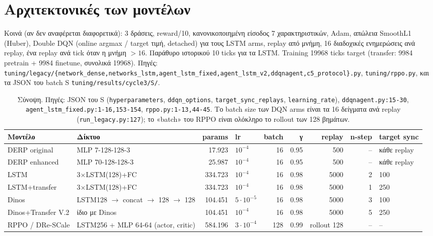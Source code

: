 \documentclass[10pt,a4paper]{article}
\newcommand{\ptr}[1]{{\footnotesize\texttt{#1}}}
\begin{document}
\section{Αρχιτεκτονικές των μοντέλων}
Κοινά (αν δεν αναφέρεται διαφορετικά): 3 δράσεις, reward/10, κανονικοποιημένη είσοδος 7 χαρακτηριστικών, Adam, απώλεια SmoothL1 (Huber), Double DQN (online argmax / target τιμή, detached) για τους LSTM arms, replay από μνήμη, 16 διαδοχικές ενημερώσεις ανά replay, ένα replay ανά tick όταν η μνήμη $>16$. Παράθυρο ιστορικού 10 ticks για τα LSTM. Training 19968 ticks target (transfer: 9984 pretrain + 9984 finetune, συνολικά 19968). Πηγές: \ptr{tuning/legacy/\{network\_dense,networks\_lstm,agent\_lstm\_fixed,agent\_lstm\_v2,ddqnagent,c5\_protocol\}.py}, \ptr{tuning/rppo.py}, και τα JSON του batch S \ptr{tuning/results/cycle3/S/}.
\begin{table}[H]\centering\scriptsize\setlength{\tabcolsep}{3pt}\begin{tabular}{p{2.4cm}p{3.9cm}rp{1.1cm}rrrrp{1.4cm}}\toprule
Μοντέλο & Δίκτυο & params & lr & batch & γ & replay & n-step & target sync\\\midrule
DERP original & MLP 7-128-128-3 & 17.923 & $10^{-4}$ & 16 & 0.95 & 500 & -- & κάθε replay\\
DERP enhanced & MLP 70-128-128-3 & 25.987 & $10^{-4}$ & 16 & 0.95 & 500 & -- & κάθε replay\\
LSTM & 3$\times$LSTM(128)+FC & 334.723 & $10^{-4}$ & 16 & 0.98 & 5000 & 2 & 100\\
LSTM+transfer & 3$\times$LSTM(128)+FC & 334.723 & $10^{-4}$ & 16 & 0.98 & 5000 & 1 & 250\\
Dinos & LSTM128 $\to$ concat $\to$ 128 $\to$ 128 & 104.451 & $5\cdot10^{-5}$ & 16 & 0.98 & 5000 & 3 & 100\\
Dinos+Transfer V.2 & ίδιο με Dinos & 104.451 & $10^{-4}$ & 16 & 0.98 & 5000 & 5 & 250\\
RPPO / DRe-SCale & LSTM256 + MLP 64-64 (actor, critic) & 584.196 & $3\cdot10^{-4}$ & 128 & 0.99 & rollout 128 & -- & -- \\\bottomrule\end{tabular}
\caption{Σύνοψη. Πηγές: JSON του S (\texttt{hyperparameters}, \texttt{ddqn\_options}, \texttt{target\_sync\_replays}, \texttt{learning\_rate}), \ptr{ddqnagent.py:15-30}, \ptr{agent\_lstm\_fixed.py:1-16,153-154}, \ptr{rppo.py:1-13,44-45}. Το batch size των DQN arms είναι τα 16 δείγματα ανά replay (\ptr{run\_legacy.py:127}); το «batch» του RPPO είναι ολόκληρο το rollout των 128 βημάτων.}\end{table}
\end{document}
